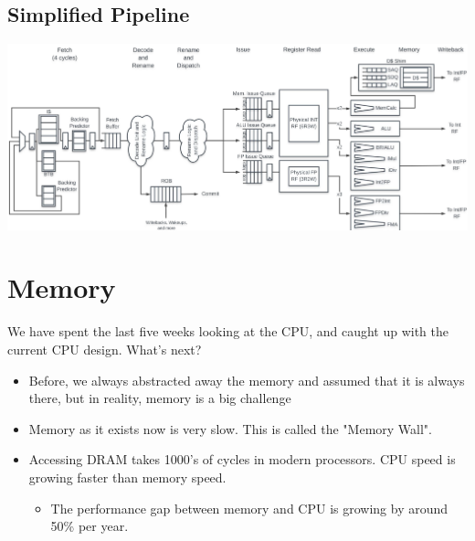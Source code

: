 \documentclass[10pt]{article}
\begin{document}
\subsection*{Simplified Pipeline}
\begin{center}
    \includegraphics*[width=\textwidth]{W6_5.png}
\end{center}
\section*{Memory}
We have spent the last five weeks looking at the CPU, and caught up with the current CPU design.  What's next?
\begin{itemize}
    \item Before, we always abstracted away the memory and assumed that it is always there, but in reality, memory is a big challenge
    \item Memory as it exists now is very slow.  This is called the "Memory Wall". 
    \item Accessing DRAM takes 1000's of cycles in modern processors.  CPU speed is growing faster than memory speed.
    \begin{itemize}
        \item The performance gap between memory and CPU is growing by around 50\% per year.
    \end{itemize}
\end{itemize}
\end{document}
